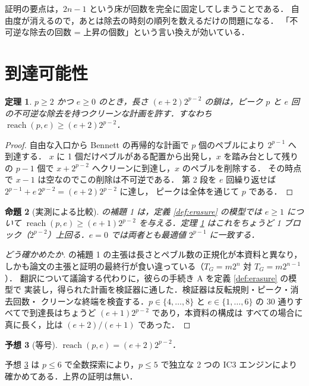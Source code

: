 \documentclass[a4paper,11pt]{jsarticle}
\newtheorem{theorem}{定理}
\newtheorem{proposition}[theorem]{命題}
\newtheorem{conjecture}[theorem]{予想}
\theoremstyle{definition}
\newcommand{\reach}{\operatorname{reach}}
\begin{document}
証明の要点は，$2n-1$ という床が回数を完全に固定してしまうことである．
自由度が消えるので，あとは除去の時刻の順列を数えるだけの問題になる．
「不可逆な除去の回数 = 上昇の個数」という言い換えが効いている．

\section{到達可能性}\label{sec:reach}
\begin{theorem}\label{thm:B1}
$p \ge 2$ かつ $e \ge 0$ のとき，長さ $(e+2)2^{p-2}$ の鎖は，ピーク $p$ と
$e$ 回の不可逆な除去を持つクリーンな計画を許す．すなわち
$\reach(p,e) \ge (e+2)2^{p-2}$．
\end{theorem}
\begin{proof}
自由な入口から Bennett の再帰的な計画で $p$ 個のペブルにより $2^{p-1}$ へ到達する．
$x$ に 1 個だけペブルがある配置から出発し，$x$ を踏み台として残りの $p-1$ 個で
$x + 2^{p-2}$ へクリーンに到達し，$x$ のペブルを削除する．
その時点で $x-1$ は空なのでこの削除は不可逆である．
第 2 段を $e$ 回繰り返せば $2^{p-1} + e\,2^{p-2} = (e+2)2^{p-2}$ に達し，
ピークは全体を通じて $p$ である．
\end{proof}

\begin{proposition}[実測による比較]\label{prop:ltv}
\cite{LiTV98} の補題 1 は，定義 \ref{def:erasure} の模型では $e \ge 1$ について
$\reach(p,e) \ge (e+1)2^{p-2}$ を与える．定理 \ref{thm:B1} はこれをちょうど
1 ブロック（$2^{p-2}$）上回る．$e = 0$ では両者とも最適値 $2^{p-1}$ に一致する．
\end{proposition}
\begin{proof}[どう確かめたか]
\cite{LiTV98} の補題 1 の主張は長さとペブル数の正規化が本資料と異なり，
しかも論文の主張と証明の最終行が食い違っている（$T_G = m2^n$ 対 $T_G = m2^{n-1}$）．
翻訳について議論する代わりに，彼らの手続き A を定義 \ref{def:erasure} の模型で
実装し，得られた計画を検証器に通した．検証器は反転規則・ピーク・消去回数・
クリーンな終端を検査する．$p \in \{4,\dots,8\}$ と $e \in \{1,\dots,6\}$ の
30 通りすべてで到達長はちょうど $(e+1)2^{p-2}$ であり，本資料の構成は
すべての場合に真に長く，比は $(e+2)/(e+1)$ であった．
\end{proof}

\begin{conjecture}[等号]\label{conj:B2}
$\reach(p,e) = (e+2)2^{p-2}$．
\end{conjecture}

予想 \ref{conj:B2} は $p \le 6$ で全数探索により，$p \le 5$ で独立な 2 つの
IC3 エンジンにより確かめてある．上界の証明は無い．
\end{document}
